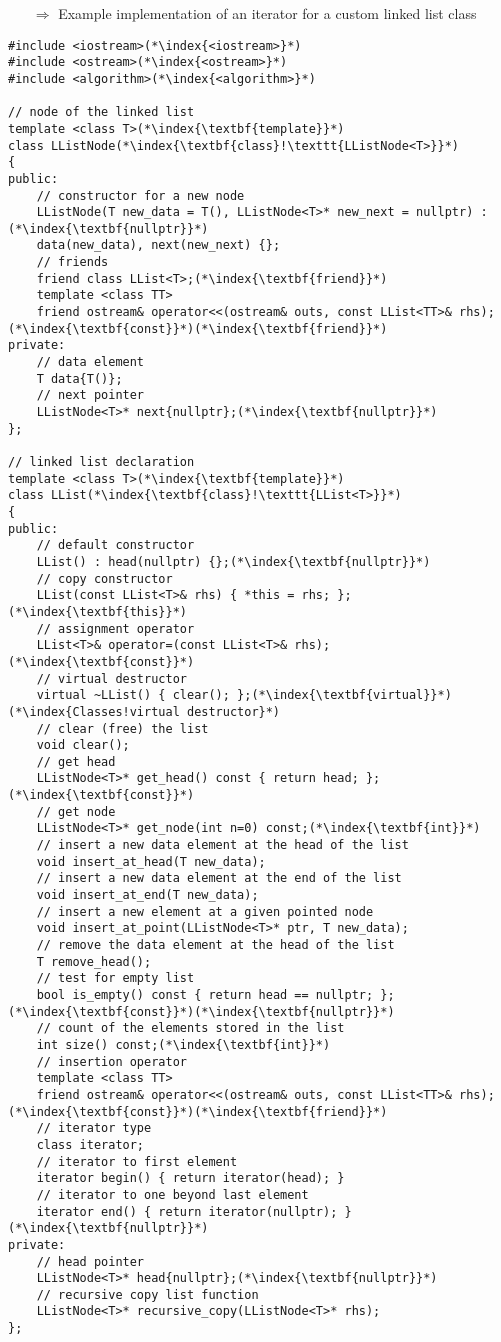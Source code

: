 \documentclass[10pt]{article}
\begin{document}
\begin{enumerate}
\item[$\Rightarrow$] Example implementation of an iterator for a custom linked list class
\end{enumerate}
\begin{lstlisting}
#include <iostream>(*\index{<iostream>}*)
#include <ostream>(*\index{<ostream>}*)
#include <algorithm>(*\index{<algorithm>}*)

// node of the linked list
template <class T>(*\index{\textbf{template}}*)
class LListNode(*\index{\textbf{class}!\texttt{LListNode<T>}}*)
{
public:
    // constructor for a new node
    LListNode(T new_data = T(), LListNode<T>* new_next = nullptr) :(*\index{\textbf{nullptr}}*)
    data(new_data), next(new_next) {};
    // friends
    friend class LList<T>;(*\index{\textbf{friend}}*)
    template <class TT>
    friend ostream& operator<<(ostream& outs, const LList<TT>& rhs);(*\index{\textbf{const}}*)(*\index{\textbf{friend}}*)
private:
    // data element
    T data{T()};
    // next pointer
    LListNode<T>* next{nullptr};(*\index{\textbf{nullptr}}*)
};

// linked list declaration
template <class T>(*\index{\textbf{template}}*)
class LList(*\index{\textbf{class}!\texttt{LList<T>}}*)
{
public:
    // default constructor
    LList() : head(nullptr) {};(*\index{\textbf{nullptr}}*)
    // copy constructor
    LList(const LList<T>& rhs) { *this = rhs; };(*\index{\textbf{this}}*)
    // assignment operator
    LList<T>& operator=(const LList<T>& rhs);(*\index{\textbf{const}}*)
    // virtual destructor
    virtual ~LList() { clear(); };(*\index{\textbf{virtual}}*)(*\index{Classes!virtual destructor}*)
    // clear (free) the list
    void clear();
    // get head
    LListNode<T>* get_head() const { return head; };(*\index{\textbf{const}}*)
    // get node
    LListNode<T>* get_node(int n=0) const;(*\index{\textbf{int}}*)
    // insert a new data element at the head of the list
    void insert_at_head(T new_data);
    // insert a new data element at the end of the list
    void insert_at_end(T new_data);
    // insert a new element at a given pointed node
    void insert_at_point(LListNode<T>* ptr, T new_data);
    // remove the data element at the head of the list
    T remove_head();
    // test for empty list
    bool is_empty() const { return head == nullptr; };(*\index{\textbf{const}}*)(*\index{\textbf{nullptr}}*)
    // count of the elements stored in the list
    int size() const;(*\index{\textbf{int}}*)
    // insertion operator
    template <class TT>
    friend ostream& operator<<(ostream& outs, const LList<TT>& rhs);(*\index{\textbf{const}}*)(*\index{\textbf{friend}}*)
    // iterator type
    class iterator;
    // iterator to first element
    iterator begin() { return iterator(head); }
    // iterator to one beyond last element
    iterator end() { return iterator(nullptr); }(*\index{\textbf{nullptr}}*)
private:
    // head pointer
    LListNode<T>* head{nullptr};(*\index{\textbf{nullptr}}*)
    // recursive copy list function
    LListNode<T>* recursive_copy(LListNode<T>* rhs);
};


\end{lstlisting}
\end{document}
